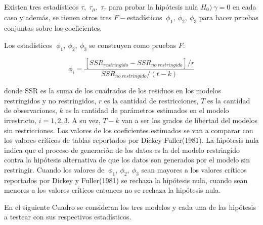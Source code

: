 \documentclass[
  12pt]{article}
\begin{document}
Existen tres estadísticos \(\tau,\;\tau_{\mu},\;\tau_{\tau}\) para
probar la hipótesis nula \(H_0)\:\gamma=0\) en cada caso y además, se
tienen otros tres \(F-\)estadísticos \(\:\phi_1,\:\phi_2,\:\phi_3\) para
hacer pruebas conjuntas sobre los coeficientes.

Los estadísticos \(\:\phi_1,\:\phi_2,\:\phi_3\) se construyen como
pruebas \(F\):

\begin{equation*}
    \phi_{i}=\frac{\left[SSR_{restringido}-SSR_{no\:restringido}\right]/r}{SSR_{no\:restringido}/(t-k)}    
\end{equation*}

donde SSR es la suma de los cuadrados de los residuos en los modelos
restringidos y no restringidos, \(r\) es la cantidad de restricciones,
\(T\) es la cantidad de observaciones, \(k\) es la cantidad de
parámetros estimados en el modelo irrestricto, \(i=1,2,3\). A su vez,
\(T-k\) van a ser los grados de libertad del modelos sin restricciones.
Los valores de los coeficientes estimados se van a comparar con los
valores críticos de tablas reportados por Dickey-Fuller(1981). La
hipótesis nula indica que el proceso de generación de los datos es la
del modelo restringido contra la hipótesis alternativa de que los datos
son generados por el modelo sin restringir. Cuando los valores de
\(\:\phi_1,\:\phi_2,\:\phi_3\) sean mayores a los valores críticos
reportados por Dickey y Fuller(1981) se rechaza la hipótesis nula,
cuando sean menores a los valores críticos entonces no se rechaza la
hipótesis nula.

En el siguiente Cuadro se consideran los tres modelos y cada una de las
hipótesis a testear con sus respectivos estadísticos.
\end{document}
